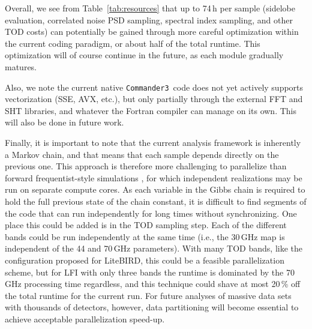 \documentclass[twocolumn]{aa}
\def\commanderthree{\texttt{Commander3}}
\begin{document}
Overall, we see from Table~\ref{tab:resources} that up to 74\,h per
sample (sidelobe evaluation, correlated noise PSD sampling, spectral
index sampling, and other TOD costs) can potentially be gained through
more careful optimization within the current coding paradigm, or about
half of the total runtime. This optimization will of course continue
in the future, as each module gradually matures.

Also, we note the current native \commanderthree\ code does not yet
actively supports vectorization (SSE, AVX, etc.), but only partially
through the external FFT and SHT libraries, and whatever the Fortran
compiler can manage on its own. This will also be done in future
work. 

Finally, it is important to note that the current analysis framework
is inherently a Markov chain, and that means that each sample depends
directly on the previous one. This approach is therefore more
challenging to parallelize than forward frequentist-style simulations
\citep[e.g.,][]{planck2014-a14}, for which independent realizations
may be run on separate compute cores. As each variable in the Gibbs
chain is required to hold the full previous state of the chain
constant, it is difficult to find segments of the code that can run
independently for long times without synchronizing. One place this
could be added is in the TOD sampling step. Each of the different
bands could be run independently at the same time (i.e., the 30\,GHz
map is independent of the 44 and 70\,GHz parameters). With many TOD
bands, like the configuration proposed for LiteBIRD, this could be a feasible
parallelization scheme, but for LFI with only three bands the runtime
is dominated by the 70 GHz processing time regardless, and this
technique could shave at most 20\,\% off the total runtime for the
current run. For future analyses of massive data sets with thousands
of detectors, however, data partitioning will become essential to
achieve acceptable parallelization speed-up.



\end{document}
